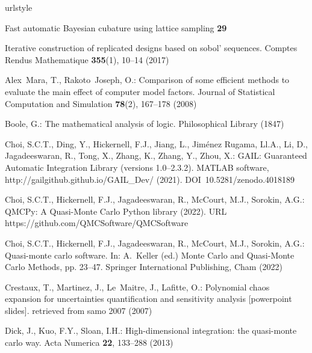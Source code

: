 \documentclass[graybox]{svmult}
\begin{document}
\begin{thebibliography}{10}
\providecommand{\url}[1]{{#1}}
\providecommand{\urlprefix}{URL }
\expandafter\ifx\csname urlstyle\endcsname\relax
  \providecommand{\doi}[1]{DOI~\discretionary{}{}{}#1}\else
  \providecommand{\doi}{DOI~\discretionary{}{}{}\begingroup
  \urlstyle{rm}\Url}\fi

Fast automatic Bayesian cubature using lattice sampling \textbf{29}

Iterative construction of replicated designs based on sobol' sequences.
\newblock Comptes Rendus Mathematique \textbf{355}(1), 10--14 (2017)

Alex~Mara, T., Rakoto~Joseph, O.: Comparison of some efficient methods to
  evaluate the main effect of computer model factors.
\newblock Journal of Statistical Computation and Simulation \textbf{78}(2),
  167--178 (2008)

Boole, G.: The mathematical analysis of logic.
\newblock Philosophical Library (1847)

Choi, S.C.T., Ding, Y., Hickernell, F.J., Jiang, L., {Jim\'enez Rugama},
  {\relax Ll}.A., Li, D., Jagadeeswaran, R., Tong, X., Zhang, K., Zhang, Y.,
  Zhou, X.: {GAIL}: {G}uaranteed {A}utomatic {I}ntegration {L}ibrary (versions
  1.0--2.3.2).
\newblock MATLAB software, \url{http://gailgithub.github.io/GAIL\_Dev/} (2021).
\newblock \doi{10.5281/zenodo.4018189}

Choi, S.C.T., Hickernell, F.J., Jagadeeswaran, R., McCourt, M.J., Sorokin,
  A.G.: {QMCPy}: A {Q}uasi-{M}onte {C}arlo {P}ython library (2022).
\newblock \urlprefix\url{https://github.com/QMCSoftware/QMCSoftware}

Choi, S.C.T., Hickernell, F.J., Jagadeeswaran, R., McCourt, M.J., Sorokin,
  A.G.: Quasi-monte carlo software.
\newblock In: A.~Keller (ed.) Monte Carlo and Quasi-Monte Carlo Methods, pp.
  23--47. Springer International Publishing, Cham (2022)

Crestaux, T., Martinez, J., Le~Maitre, J., Lafitte, O.: Polynomial chaos
  expansion for uncertainties quantification and sensitivity analysis
  [powerpoint slides]. retrieved from samo 2007 (2007)

Dick, J., Kuo, F.Y., Sloan, I.H.: High-dimensional integration: the quasi-monte
  carlo way.
\newblock Acta Numerica \textbf{22}, 133--288 (2013)


\end{thebibliography}
\end{document}
